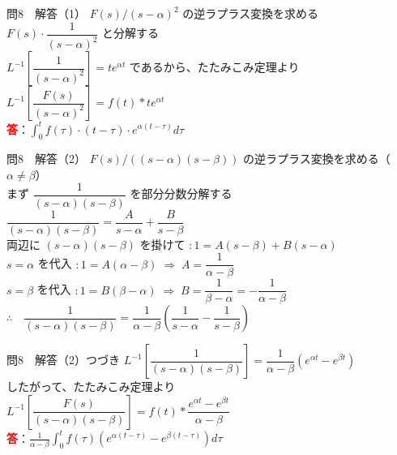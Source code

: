 \documentclass[professionalfonts]{beamer}
\begin{document}
\begin{frame}{問8　解答（1）}
  $F(s)/(s-\alpha)^{2}$ の逆ラプラス変換を求める\\[8pt]
  $F(s)\cdot\dfrac{1}{(s-\alpha)^{2}}$ と分解する\\[8pt]
  $L^{-1}\!\left[\dfrac{1}{(s-\alpha)^{2}}\right] = te^{\alpha t}$ であるから、たたみこみ定理より\\[8pt]
  $L^{-1}\!\left[\dfrac{F(s)}{(s-\alpha)^{2}}\right] = f(t) * te^{\alpha t}$
  \\[8pt]\textcolor{red}{\textbf{答}}：$\displaystyle\int_{0}^t f(\tau)\cdot(t-\tau)\cdot e^{\alpha(t-\tau)}d\tau$
\end{frame}

\begin{frame}{問8　解答（2）}
  $F(s)/((s-\alpha)(s-\beta))$ の逆ラプラス変換を求める（$\alpha \neq \beta$）\\[8pt]
  まず $\dfrac{1}{(s-\alpha)(s-\beta)}$ を部分分数分解する\\[8pt]
  $\dfrac{1}{(s-\alpha)(s-\beta)} = \dfrac{A}{s-\alpha} + \dfrac{B}{s-\beta}$\\[8pt]
  両辺に $(s-\alpha)(s-\beta)$ を掛けて $: 1 = A(s-\beta) + B(s-\alpha)$\\[4pt]
  $s = \alpha$ を代入 $: 1 = A(\alpha-\beta) \;\Rightarrow\; A = \dfrac{1}{\alpha-\beta}$\\[4pt]
  $s = \beta$ を代入 $: 1 = B(\beta-\alpha) \;\Rightarrow\; B = \dfrac{1}{\beta-\alpha} = -\dfrac{1}{\alpha-\beta}$\\[8pt]
  $\therefore\quad \dfrac{1}{(s-\alpha)(s-\beta)} = \dfrac{1}{\alpha-\beta}\!\left(\dfrac{1}{s-\alpha} - \dfrac{1}{s-\beta}\right)$
\end{frame}

\begin{frame}{問8　解答（2）つづき}
  $L^{-1}\!\left[\dfrac{1}{(s-\alpha)(s-\beta)}\right]
   = \dfrac{1}{\alpha-\beta}\!\left(e^{\alpha t} - e^{\beta t}\right)$\\[8pt]
  したがって、たたみこみ定理より\\[8pt]
  $L^{-1}\!\left[\dfrac{F(s)}{(s-\alpha)(s-\beta)}\right]
   = f(t) * \dfrac{e^{\alpha t} - e^{\beta t}}{\alpha-\beta}$
  \\[8pt]\textcolor{red}{\textbf{答}}：$\displaystyle\frac{1}{\alpha-\beta}\int_{0}^t f(\tau)\!\left(e^{\alpha(t-\tau)}-e^{\beta(t-\tau)}\right)d\tau$
\end{frame}
\end{document}
